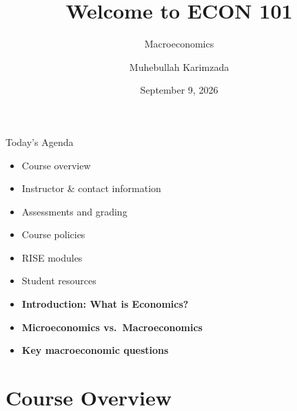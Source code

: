 \documentclass[aspectratio=169]{beamer}
\title{\textbf{Welcome to ECON 101}}
\subtitle{{\large Macroeconomics}}
\author{Muhebullah Karimzada}
\institute{School of Economics \\ University of Northern British Columbia}
\date{September 9, 2026}
\begin{document}

\begin{frame}[plain]
  \titlepage
\end{frame}

\begin{frame}{Today's Agenda}
\transfade
\begin{itemize}
  \item Course overview
  \item Instructor \& contact information
  \item Assessments and grading
  \item Course policies
  \item RISE modules
  \item Student resources
  \item \textbf{Introduction: What is Economics?}
  \item \textbf{Microeconomics vs.\ Macroeconomics}
  \item \textbf{Key macroeconomic questions}
\end{itemize}
\end{frame}

\section{Course Overview}
\end{document}
